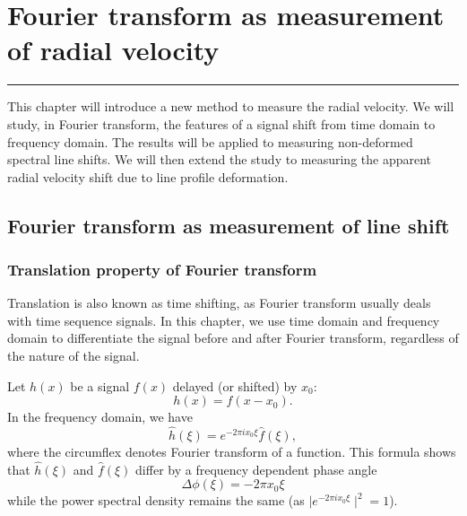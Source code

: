 \chapter{Fourier transform as measurement of radial velocity}
\label{\thechapter}
\label{ch:Methods}


\rule{\textwidth}{1.6pt}
\minitoc
\clearpage


This chapter will introduce a new method to measure the radial velocity. We will study, in Fourier transform, 
the features of a signal shift from time domain to frequency domain. The results will be applied to measuring non-deformed
spectral line shifts. We will then extend the study to measuring the apparent radial velocity shift 
due to line profile deformation. 


\section{Fourier transform as measurement of line shift}
\label{\thesection}
\label{ch:FT_line_shift}


\subsection{Translation property of Fourier transform}
Translation is also known as time shifting, as Fourier transform usually deals with time sequence signals. 
In this chapter, we use time domain and frequency domain to differentiate the signal before and after Fourier transform,
regardless of the nature of the signal. 

Let $h(x)$ be a signal $f(x)$ delayed (or shifted) by $x_0$:
\begin{equation}
	h(x) = f(x-x_0).
\label{eq:FT1}
\end{equation}
In the frequency domain, we have 
\begin{equation}
	\hat{h}(\xi) = e^{-2 \pi ix_0 \xi} \hat{f}(\xi),
\label{eq:FT2}
\end{equation}
where the circumflex denotes Fourier transform of a function. This formula shows that $\hat{h}(\xi)$ and $\hat{f}(\xi)$ 
differ by a frequency dependent phase angle 
\begin{equation}
	\Delta \phi(\xi) = -2 \pi x_0 \xi
\label{eq:PhaseShift}
\end{equation}
while the power spectral density remains the same (as $\mid e^{-2 \pi ix_0 \xi}\mid ^2 = 1$).


